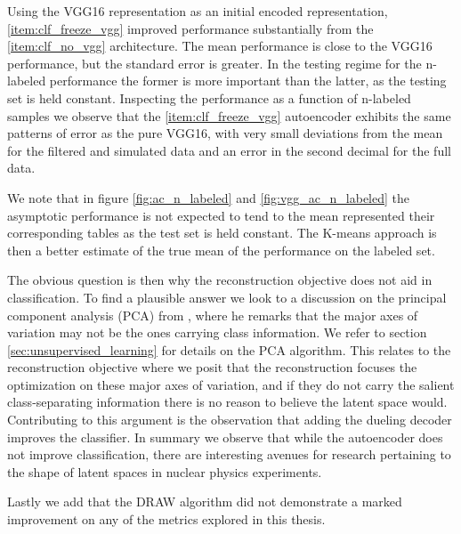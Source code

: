 Using the VGG16 representation as an initial encoded representation, \ref{item:clf_freeze_vgg} improved performance substantially from the \ref{item:clf_no_vgg} architecture. The mean performance is  close to the VGG16 performance, but the standard error is greater. In the testing regime for the n-labeled performance the former is more important than the latter, as the testing set is held constant. Inspecting the performance as a function of n-labeled samples we observe that the \ref{item:clf_freeze_vgg} autoencoder exhibits the same patterns of error as the pure VGG16, with very small deviations from the mean for the filtered and simulated data and an error in the second decimal for the full data.

We note that in figure \ref{fig:ac_n_labeled} and \ref{fig:vgg_ac_n_labeled} the asymptotic performance is not expected to tend to the mean represented their corresponding tables as the test set is held constant. The K-means approach is then a better estimate of the true mean of the performance on the labeled set.

The obvious question is then why the reconstruction objective does not aid in classification. To find a plausible answer we look to a discussion on the principal component analysis (PCA) from \cite{Jolliffe1982}, where he remarks that the major axes of variation may not be the ones carrying class information. We refer to section \ref{sec:unsupervised_learning} for details on the PCA algorithm. This relates to the reconstruction objective where we posit that the reconstruction focuses the optimization on these major axes of variation, and if they do not carry the salient class-separating information there is no reason to believe the latent space would. Contributing to this argument is the observation that adding the dueling decoder improves the classifier. In summary we observe that while the autoencoder does not improve classification, there are interesting avenues for research pertaining to the shape of latent spaces in nuclear physics experiments.

Lastly we add that the DRAW algorithm did not demonstrate a marked improvement on any of the metrics explored in this thesis.


